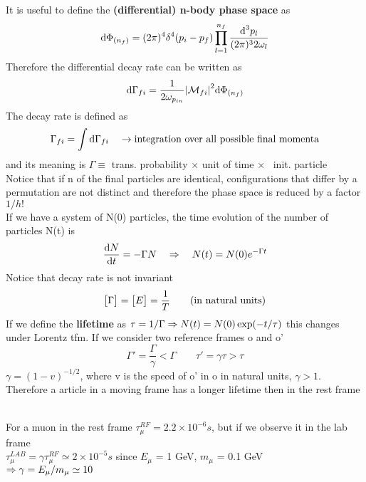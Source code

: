 \documentclass[TheoreticalPhy_ModB.tex]{subfiles}
\begin{document}
It is useful to define the \textbf{(differential) n-body phase space} as
\[
\textup{d} \Phi_{(n_f)} = (2 \pi)^4 \delta^4 (p_i - p_f) \prod_{l=1}^{n_f} \frac{\textup{d}^3 p_l}{(2 \pi)^3 2 \omega_l}
\]
Therefore the differential decay rate can be written as
\[
\textup{d} \Gamma_{fi} = \frac{1}{2 \omega_{p_{in}}} \abs{\mathcal{M}_{fi}}^2 \textup{d} \Phi_{(n_f)}
\]
The decay rate is defined as
\[
\Gamma_{fi} = \int \textup{d} \Gamma_{fi}
\quad
\to \textup{integration over all possible final momenta}
\]
and its meaning is $\Gamma \equiv$ trans. probability $\times$ unit of time $\times$ \ init. particle\\
Notice that if n of the final particles are identical, configurations that differ by a permutation are not distinct and therefore the phase space is reduced by a factor $1/h!$\\
If we have a system of N(0) particles, the time evolution of the number of particles N(t) is
\[
\frac{\textup{d} N}{\textup{d} t} = - \Gamma N
\quad \Rightarrow \quad
N(t) = N(0) e^{-\Gamma t}
\]
Notice that decay rate is not invariant
\[
\bigl[ \Gamma \bigr] = \bigl[ E \bigr] = \frac{1}{T}
\qquad
\textup{(in natural units)}
\]
If we define the \textbf{lifetime} as $\tau = 1/\Gamma \Rightarrow N(t) = N(0) \exp(-t/\tau)$ this changes under Lorentz tfm. If we consider two reference frames o and o'
\[
\Gamma' = \frac{\Gamma}{\gamma} < \Gamma
\qquad
\tau' = \gamma \tau > \tau
\]
$\gamma = (1 - v)^{-1/2}$, where v is the speed of o' in o in natural units, $\gamma > 1$. Therefore a article in a moving frame has a longer lifetime then in the rest frame\\ \\
\begin{example}
For a muon in the rest frame $\tau_{\mu}^{RF} = 2.2 \times 10^{-6} s$, but if we observe it in the lab frame \\
$\tau_{\mu}^{LAB} = \gamma \tau_{\mu}^{RF} \simeq 2 \times 10^{-5} s$ since $E_{\mu}$ = 1 GeV, $m_{\mu}$ = 0.1 GeV \\
$\Rightarrow \gamma = E_{\mu} / m_{\mu} \simeq 10$ 
\end{example}
\end{document}
